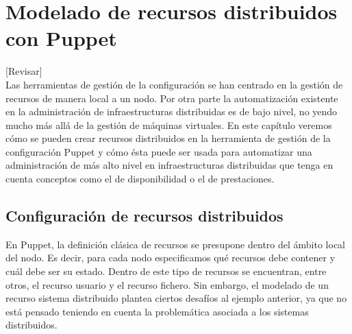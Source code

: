 \chapter{Modelado de recursos distribuidos con Puppet}
\label{cap:modelado}

[Revisar]\\

Las herramientas de gestión de la configuración se han centrado en la gestión de recursos de manera local a un nodo. Por otra parte la automatización existente en la administración de infraestructuras distribuidas es de bajo nivel, no yendo mucho más allá de la gestión de máquinas virtuales. En este capítulo veremos cómo se pueden crear recursos distribuidos en la herramienta de gestión de la configuración Puppet y cómo ésta puede ser usada para automatizar una administración de más alto nivel en infraestructuras distribuidas que tenga en cuenta conceptos como el de disponibilidad o el de prestaciones.


\section{Configuración de recursos distribuidos}

En Puppet, la definición clásica de recursos se presupone dentro del ámbito local del nodo. Es decir, para cada nodo especificamos qué recursos debe contener y cuál debe ser su estado. Dentro de este tipo de recursos se encuentran, entre otros, el recurso usuario y el recurso fichero. Sin embargo, el modelado de un recurso sistema distribuido plantea ciertos desafíos al ejemplo anterior, ya que no está pensado teniendo en cuenta la problemática asociada a los sistemas distribuidos. \\


